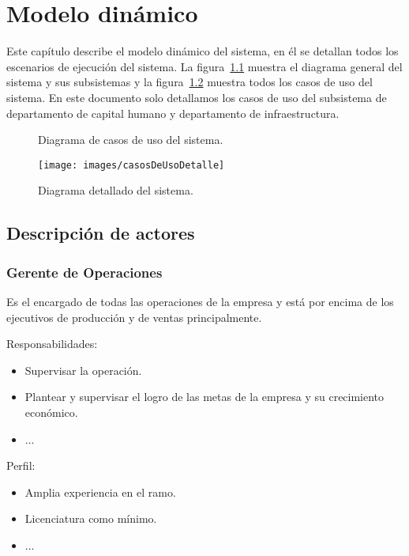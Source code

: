 \chapter{Modelo dinámico}	
\label{cap:modDinamico}

	Este capítulo describe el modelo dinámico del sistema, en él se detallan todos los escenarios de ejecución del sistema. La figura~\ref{fig:casosDeUso} muestra el diagrama general del sistema y sus subsistemas y la figura~\ref{fig:casosDeUsoDetalle} muestra todos los casos de uso del sistema. En este documento solo detallamos los casos de uso del subsistema de departamento de capital humano y departamento de infraestructura.
	
\begin{figure}[htbp]
	\begin{center}
		\caption{Diagrama de casos de uso del sistema.}
		\label{fig:casosDeUso}
	\end{center}
\end{figure}

\begin{figure}[htbp]
	\begin{center}
		\texttt{[image: images/casosDeUsoDetalle]}
		\caption{Diagrama detallado del sistema.}
		\label{fig:casosDeUsoDetalle}
	\end{center}
\end{figure}

\section{Descripción de actores}

\begin{Usuario}{\hypertarget{getenteOperaciones}{\subsection{Gerente de Operaciones}}}{
	Es el encargado de todas las operaciones de la empresa y está por encima de los ejecutivos de producción y de ventas principalmente.
}
    \item[Responsabilidades:] \cdtEmpty
    \begin{itemize}
		\item Supervisar la operación.
		\item Plantear y supervisar el logro de las metas de la empresa y su crecimiento económico.
		\item ...
    \end{itemize}

	\item[Perfil:] \cdtEmpty
    \begin{itemize}
		\item Amplia experiencia en el ramo.
		\item Licenciatura como mínimo.
		\item ...
    \end{itemize}
\end{Usuario}

